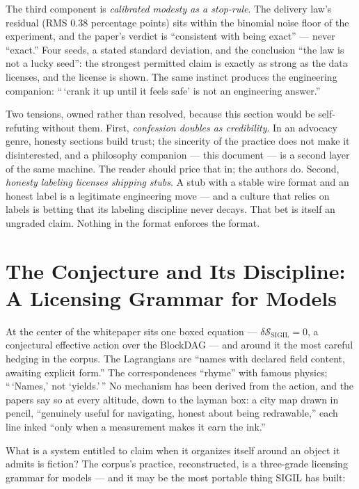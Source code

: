 \documentclass[10pt,a4paper]{article}
\newcommand{\SSIGIL}{\mathcal{S}_{\mathrm{SIGIL}}}
\begin{document}
The third component is \emph{calibrated modesty as a stop-rule}. The delivery law's
residual (RMS 0.38 percentage points) sits within the binomial noise floor of the
experiment, and the paper's verdict is ``consistent with being exact'' — never
``exact.'' Four seeds, a stated standard deviation, and the conclusion ``the law
is not a lucky seed'': the strongest permitted claim is exactly as strong as the
data licenses, and the license is shown. The same instinct produces the
engineering companion: ``\,`crank it up until it feels safe' is not an engineering
answer.''

Two tensions, owned rather than resolved, because this section would be
self-refuting without them. First, \emph{confession doubles as credibility}. In an
advocacy genre, honesty sections build trust; the sincerity of the practice does
not make it disinterested, and a philosophy companion — this document — is a second
layer of the same machine. The reader should price that in; the authors do. Second,
\emph{honesty labeling licenses shipping stubs}. A stub with a stable wire format
and an honest label is a legitimate engineering move — and a culture that relies on
labels is betting that its labeling discipline never decays. That bet is itself an
ungraded claim. Nothing in the format enforces the format.

\section{The Conjecture and Its Discipline: A Licensing Grammar for Models}\label{sec:conjecture}

At the center of the whitepaper sits one boxed equation — $\delta\SSIGIL=0$, a
conjectural effective action over the BlockDAG — and around it the most careful
hedging in the corpus. The Lagrangians are ``names with declared field content,
awaiting explicit form.'' The correspondences ``rhyme'' with famous physics;
``\,`Names,' not `yields.'\,'' No mechanism has been derived from the action, and the
papers say so at every altitude, down to the layman box: a city map drawn in
pencil, ``genuinely useful for navigating, honest about being redrawable,'' each
line inked ``only when a measurement makes it earn the ink.''

What is a system entitled to claim when it organizes itself around an object it
admits is fiction? The corpus's practice, reconstructed, is a three-grade licensing
grammar for models — and it may be the most portable thing SIGIL has built:
\end{document}
